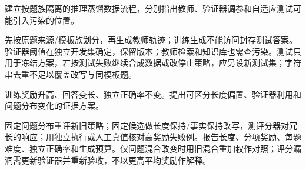 \begin{exercises}
\begin{exercise} 建立按题族隔离的推理蒸馏数据流程，分别指出教师、验证器调参和自适应测试可能引入污染的位置。

\begin{solution}
先按原题来源/模板族划分，再生成教师轨迹；训练生成不能访问封存测试答案。验证器阈值在独立开发集确定，保留版本；教师检索和知识库也需查污染。测试只用于冻结方案，若按测试失败继续合成数据或改停止策略，应另设新测试集；字符串去重不足以覆盖改写与同模板题。
\end{solution}
\end{exercise}

\begin{exercise} 训练奖励升高、回答变长、独立正确率不变。提出可区分长度偏置、验证器利用和问题分布变化的证据方案。

\begin{solution}
固定问题分布重评新旧策略；固定候选做长度保持/事实保持改写，测评分器对冗长的响应；用独立执行或人工真值核对高奖励失败例。报告长度、分项奖励、每题难度、独立正确率和生成预算。仅问题混合改变时用旧混合重加权作对照；评分漏洞需更新验证器并重新验收，不以更高平均奖励作解释。
\end{solution}
\end{exercise}

\end{exercises}
